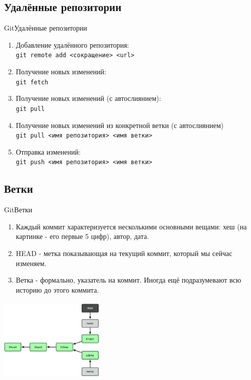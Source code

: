 \documentclass[10pt]{beamer}
\begin{document}
\subsection{Удалённые репозитории}
\begin{frame}[fragile]{Git}{Удалённые репозитории}
\begin{enumerate}
\item Добавление удалённого репозитория:\\
\texttt{git remote add <сокращение> <url>}\\

\item Получение новых изменений:\\
\texttt{git fetch}\\

\item Получение новых изменений (с автослиянием):\\
\texttt{git pull}\\

\item Получение новых изменений из конкретной ветки (с автослиянием)\\
\texttt{git pull <имя репозитория> <имя ветки>}\\

\item Отправка изменений:\\
\texttt{git push <имя репозитория> <имя ветки>}\\
\end{enumerate}
\end{frame}


\subsection{Ветки}
\begin{frame}[fragile]{Git}{Ветки}
\begin{multicols}{2}
\begin{enumerate}
\item Каждый коммит характеризуется несколькими основными вещами: хеш (на картинке - его первые 5 цифр), автор, дата.
\item HEAD -  метка показывающая на текущий коммит, который мы сейчас изменяем.
\item Ветка - формально, указатель на коммит. Иногда ещё подразумевают всю историю до этого коммита.
\end{enumerate}
\vfill\eject
\includegraphics[width=5cm, height=4cm]{Term_3/Source/Pictures/branches.png}
\end{multicols}
\end{frame}
\end{document}
